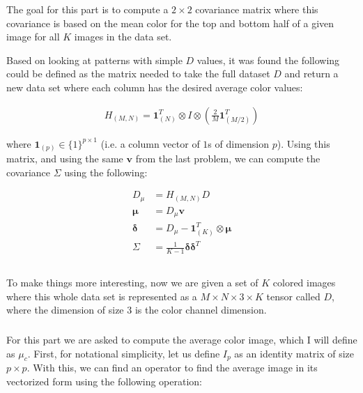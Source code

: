 \documentclass{article}[12pt]
\begin{document}
	\subsubsection{}
	The goal for this part is to compute a $2 \times 2$ covariance matrix where this covariance is based on the mean color for the top and bottom half of a given image for all $K$ images in the data set. 
	
	Based on looking at patterns with simple $D$ values, it was found the following could be defined as the matrix needed to take the full dataset $D$ and return a new data set where each column has the desired average color values:
	
	\begin{align*}
	H_{(M,N)} = \boldsymbol{1}_{(N)}^{T} \otimes I \otimes \left( \frac{2}{M} \boldsymbol{1}_{(M/2)}^{T}\right)
	\end{align*}
	
	where $\boldsymbol{1}_{(p)} \in \{1 \}^{p \times 1}$ (i.e. a column vector of $1$s of dimension $p$). Using this matrix, and using the same $\boldsymbol{v}$ from the last problem, we can compute the covariance $\Sigma$ using the following:
	
	\begin{align*}
	D_{\mu} &= H_{(M,N)}D \\
	\boldsymbol{\mu} &= D_{\mu} \boldsymbol{v} \\
	\boldsymbol{\delta} &= D_{\mu} - \boldsymbol{1}_{(K)}^{T} \otimes \boldsymbol{\mu} \\
	\Sigma &= \frac{1}{K-1} \boldsymbol{\delta} \boldsymbol{\delta}^{T}
	\end{align*}
	
	\subsection{}
	To make things more interesting, now we are given a set of $K$ colored images where this whole data set is represented as a $M \times N \times 3 \times K$ tensor called $D$, where the dimension of size 3 is the color channel dimension.
	
	\subsubsection{}
	For this part we are asked to compute the average color image, which I will define as $\mu_c$. First, for notational simplicity, let us define $I_p$ as an identity matrix of size $p \times p$. With this, we can find an operator to find the average image in its vectorized form using the following operation:
	
\end{document}
